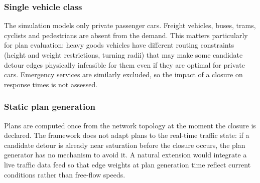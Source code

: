 \subsubsection{Single vehicle class}
The simulation models only private passenger cars. Freight vehicles, buses, trams, cyclists and
pedestrians are absent from the demand. This matters particularly for plan evaluation: heavy
goods vehicles have different routing constraints (height and weight restrictions, turning radii)
that may make some candidate detour edges physically infeasible for them even if they are optimal
for private cars. Emergency services are similarly excluded, so the impact of a closure on
response times is not assessed.

\subsubsection{Static plan generation}
Plans are computed once from the network topology at the moment the closure is declared. The
framework does not adapt plans to the real-time traffic state: if a candidate detour is already
near saturation before the closure occurs, the plan generator has no mechanism to avoid it.
A natural extension would integrate a live traffic data feed so that edge weights at plan
generation time reflect current conditions rather than free-flow speeds.

